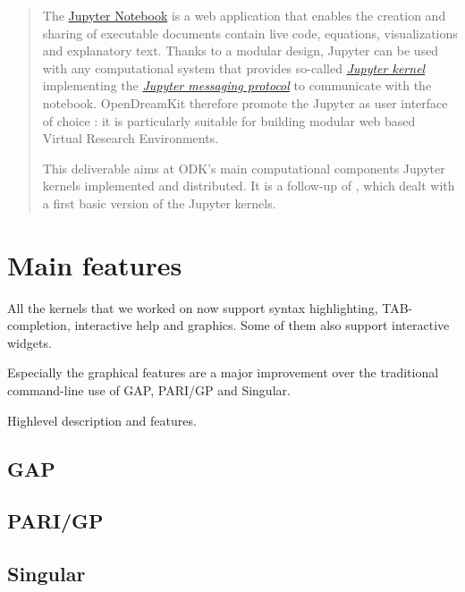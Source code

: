 \documentclass{deliverablereport}
\author{Jeroen Demeyer, Sebastian Gutsche, Nicolas M.~Thiéry}
\begin{document}
\maketitle

\begin{abstract}
The \href { https://jupyter.org } {Jupyter Notebook} is a web application
that enables the creation and sharing of executable documents
contain live code, equations, visualizations and explanatory text.
Thanks to a modular design, Jupyter can be used with any computational
system that provides so-called
\href{ https://jupyter.readthedocs.io/en/latest/projects/kernels.html}{\emph{Jupyter kernel}}
implementing the
\href{ https://jupyter-client.readthedocs.io/en/latest}{\emph{Jupyter messaging protocol}}
to communicate with the notebook. OpenDreamKit
therefore promote the Jupyter as user interface of choice :
it is particularly suitable for building modular web based Virtual Research Environments.

This deliverable aims at ODK's main computational components
Jupyter kernels implemented and distributed.
It is a follow-up of ,
which dealt with a first basic version of the Jupyter kernels.
\end{abstract}

\section{Main features}

All the kernels that we worked on now support syntax highlighting, TAB-completion,
interactive help and graphics. Some of them also support interactive widgets.

Especially the graphical features are a major improvement over the traditional
command-line use of GAP, PARI/GP and Singular.

Highlevel description and features.

\subsection {GAP}

\subsection {PARI/GP}

\subsection {Singular}
\end{document}

